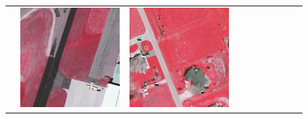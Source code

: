 \begin{figure}[H]
\begin{tabularx}{\textwidth}{c|*{9}{X}}
    &  \includegraphics[trim={650pt 120pt 170pt 720pt},clip,width=\linewidth]{images/015Results/02perm_exp/comp_images/irgb/487.png}
    & \includegraphics[trim={230pt 200pt 680pt 725pt},clip,width=\linewidth]{images/015Results/02perm_exp/comp_images/irgb/509.png}

\end{tabularx}
\end{figure}
